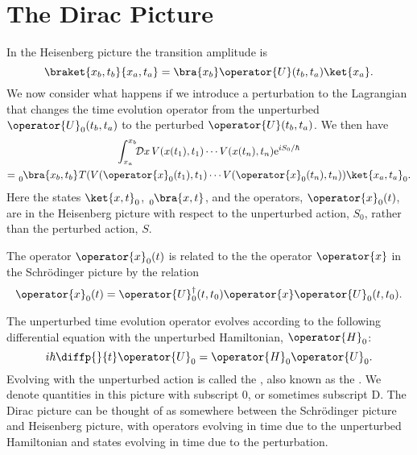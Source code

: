 \documentclass[fleqn]{NotesClass}
\newcommand*{\e}{\mathrm{e}}
\newcommand*{\hermit}{\dagger}
\newcommand*{\hamiltonian}{H}
\newcommand*{\timeorder}{T}
\begin{document}
    \section{The Dirac Picture}
    In the Heisenberg picture the transition amplitude is
    \begin{equation}
        \braket{x_b, t_b}{x_a, t_a} = \bra{x_b} \operator{U}(t_b, t_a) \ket{x_a}.
    \end{equation}
    We now consider what happens if we introduce a perturbation to the Lagrangian that changes the time evolution operator from the unperturbed \(\operator{U}_0(t_b, t_a)\) to the perturbed \(\operator{U}(t_b, t_a)\).
    We then have
    \begin{multline}
        \int_{x_a}^{x_b} \!\! \DL{x} \, V(x(t_1), t_1) \dotsm V(x(t_n), t_n) \e^{iS_0/\hbar} \\
        = \tensor[_0]{\bra{x_b, t_b}}{} \timeorder(V(\operator{x}_0(t_1), t_1) \dotsm V(\operator{x}_0(t_n), t_n))\ket{x_a, t_a}_0.
    \end{multline}
    Here the states \(\ket{x, t}_0\), \(\tensor[_0]{\bra{x, t}}{}\), and the operators, \(\operator{x}_0(t)\), are in the Heisenberg picture with respect to the unperturbed action, \(S_0\), rather than the perturbed action, \(S\).
    
    The operator \(\operator{x}_0(t)\) is related to the the operator \(\operator{x}\) in the Schr\"odinger picture by the relation
    \begin{equation}
        \operator{x}_0(t) = \operator{U}_0^\hermit(t, t_0)\operator{x}\operator{U}_0(t, t_0).
    \end{equation}
    
    The unperturbed time evolution operator evolves according to the following differential equation with the unperturbed Hamiltonian, \(\operator{\hamiltonian}_0\):
    \begin{equation}
        i\hbar\diffp{}{t}\operator{U}_0 = \operator{\hamiltonian}_0\operator{U}_0.
    \end{equation}
    Evolving with the unperturbed action is called the , also known as the .
    We denote quantities in this picture with subscript \(0\), or sometimes subscript \(\mathrm{D}\).
    The Dirac picture can be thought of as somewhere between the Schr\"odinger picture and Heisenberg picture, with operators evolving in time due to the unperturbed Hamiltonian and states evolving in time due to the perturbation.
    
\end{document}
